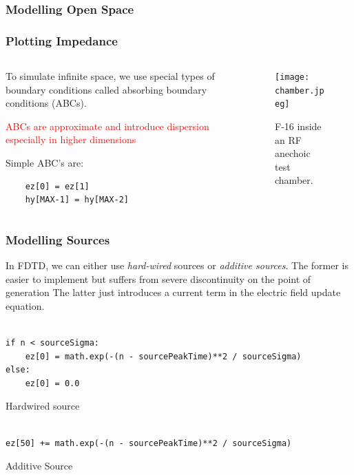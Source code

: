 \documentclass[10pt]{beamer}
\begin{document}
\begin{frame}[fragile]
    \frametitle{Modelling Open Space}
    \frametitle{Plotting Impedance}
    \begin{columns}[T] %
        \begin{column}{.4\textwidth}

            To simulate infinite space, we use special types of boundary conditions called absorbing boundary conditions (ABCs).

            \textcolor{red}{ABCs are approximate and introduce dispersion especially in higher dimensions}

            Simple ABC's are:
            \begin{verbatim}
    ez[0] = ez[1] 
    hy[MAX-1] = hy[MAX-2]
\end{verbatim}
        \end{column}
        \begin{column}[T]{.6\textwidth}
            \begin{figure}
                \centering
                \texttt{[image: chamber.jpeg]}
                \caption{F-16 inside an RF anechoic test chamber.}
            \end{figure}
        \end{column}%
    \end{columns}

\end{frame}

\begin{frame}[fragile]
    \frametitle{Modelling Sources}

    \begin{outline}
        \1  In FDTD, we can either use \textit{hard-wired} sources or \textit{additive sources}.
        \1 The former is easier to implement but suffers from severe discontinuity on the point of generation
        \1 The latter just introduces a current term in the electric field update equation.
    \end{outline}

    \scriptsize
    \begin{verbatim}
            
if n < sourceSigma:
    ez[0] = math.exp(-(n - sourcePeakTime)**2 / sourceSigma)
else:
    ez[0] = 0.0
            \end{verbatim}
    \centering
    Hardwired source
    \scriptsize
    \begin{verbatim}
            
ez[50] += math.exp(-(n - sourcePeakTime)**2 / sourceSigma)
            \end{verbatim}
    \centering
    Additive Source

\end{frame}
\end{document}
